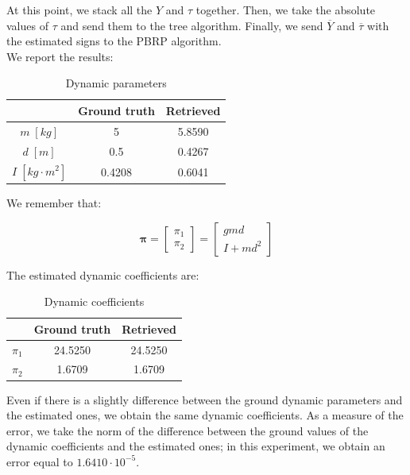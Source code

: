\documentclass{article}
\begin{document}
At this point, we stack all the $Y$ and $\tau$ together. Then, we take the absolute values of $\tau$ and send them to the tree algorithm. Finally, we send $\overline{Y}$ and $\overline{\tau}$ with the estimated signs to the PBRP algorithm. \\

We report the results:

\begin{table}[!htbp]
\centering
\begin{tabular}{|c|cc|}
\hline
& Ground truth & Retrieved\\
\hline
$m\;[kg]$ & 5 & 5.8590\\ 
$d\;[m]$ & 0.5 & 0.4267\\
$I\;[kg\cdot m^2]$ & 0.4208 & 0.6041\\
\hline
\end{tabular}
\caption{Dynamic parameters}
\end{table}
\FloatBarrier

We remember that:

\[\bm{\pi}= \begin{bmatrix}
\pi_1 \\ \pi_2
\end{bmatrix} = \begin{bmatrix}
gmd \\ I +md^2
\end{bmatrix}\]

The estimated dynamic coefficients are:

\begin{table}[!htbp]
\centering
\begin{tabular}{|c|cc|}
\hline
& Ground truth & Retrieved\\
\hline
$\pi_1$ & 24.5250 & 24.5250\\ 
$\pi_2$ & 1.6709 & 1.6709\\
\hline
\end{tabular}
\caption{Dynamic coefficients}
\end{table}
\FloatBarrier

Even if there is a slightly difference between the ground dynamic parameters and the estimated ones, we obtain the same dynamic coefficients. As a measure of the error, we take the norm of the difference between the ground values of the dynamic coefficients and the estimated ones; in this experiment, we obtain an error equal to $1.6410\cdot10^{-5}$.
\end{document}
